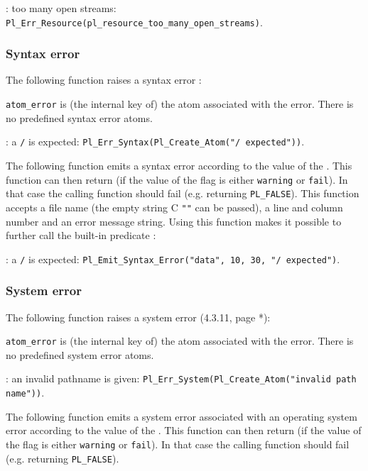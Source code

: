 : too many open streams:
\texttt{Pl\_Err\_Resource(pl\_resource\_too\_many\_open\_streams)}.

\subsubsection{Syntax error}
The following function raises a syntax error :


\texttt{atom\_error} is (the internal key of) the atom associated with the
error. There is no predefined syntax error atoms.

: a \texttt{/} is expected:
\texttt{Pl\_Err\_Syntax(Pl\_Create\_Atom("/ expected"))}.

The following function emits a syntax error according to the value of the
  . This
function can then return (if the value of the flag is either
\texttt{warning} or \texttt{fail}). In that case the calling function should
fail (e.g. returning \texttt{PL\_FALSE}). This function accepts a file name (the
empty string C \texttt{""} can be passed), a line and column number and an
error message string. Using this function makes it possible to further call
the built-in predicate 
:


: a \texttt{/} is expected:
\texttt{Pl\_Emit\_Syntax\_Error("data", 10, 30, "/ expected")}.

\subsubsection{System error}
The following function raises a system error (4.3.11, page *):


\texttt{atom\_error} is (the internal key of) the atom associated with the
error. There is no predefined system error atoms.

: an invalid pathname is given:
\texttt{Pl\_Err\_System(Pl\_Create\_Atom("invalid path name"))}.

The following function emits a system error associated with an operating
system error according to the value of the   . This function can then return (if the
value of the flag is either \texttt{warning} or \texttt{fail}). In that case
the calling function should fail (e.g. returning \texttt{PL\_FALSE}).

